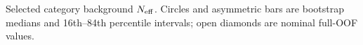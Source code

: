 Selected category background $N_{\rm eff}$. Circles and asymmetric bars are bootstrap medians and 16th--84th percentile intervals; open diamonds are nominal full-OOF values.
